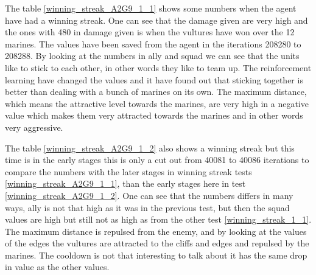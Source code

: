 
The table \ref{winning_streak_A2G9_1_1} shows some numbers when the agent have had a winning streak. One can see that the damage given are very high and the ones with 480 in damage given is when the vultures have won over the 12 marines. The values have been saved from the agent in the iterations 208280 to 208288. By looking at the numbers in ally and squad we can see that the units like to stick to each other, in other words they like to team up. The reinforcement learning have changed the values and it have found out that sticking together is better than dealing with a bunch of marines on its own. The maximum distance, which means the attractive level towards the marines, are very high in a negative value which makes them very attracted towards the marines and in other words very aggressive. 



The table \ref{winning_streak_A2G9_1_2} also shows a winning streak but this time is in the early stages this is only a cut out from 40081 to 40086 iterations to compare the numbers with the later stages in winning streak tests \ref{winning_streak_A2G9_1_1}, than the early stages here in test \ref{winning_streak_A2G9_1_2}. One can see that the numbers differs in many ways, ally is not that high as it was in the previous test, but then the squad values are high but still not as high as from the other test \ref{winning_streak_1_1}. The maximum distance is repulsed from the enemy, and by looking at the values of the edges the vultures are attracted to the cliffs and edges and repulsed by the marines. The cooldown is not that interesting to talk about it has the same drop in value as the other values.
